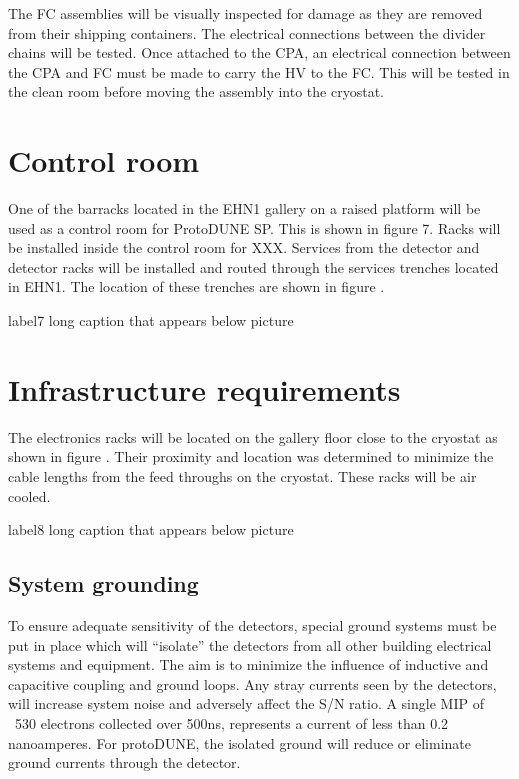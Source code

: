 The FC assemblies will be visually inspected for damage as they are removed from their shipping containers.  The electrical connections between the divider chains will be tested.  Once attached to the CPA, an electrical connection between the CPA and FC must be made to carry the HV to the FC.  This will be tested in the clean room before moving the assembly into the cryostat. 


\section{Control room}

One of the barracks located in the EHN1 gallery on a raised platform will be used as a control room for ProtoDUNE SP.  This is shown in figure 7.   Racks will be installed inside the control room for XXX.  Services from the detector and detector racks will be installed and routed through the services trenches located in EHN1.  The location of these trenches are shown in figure .  
%
\begin{cdrfigure}{label}{7 long caption that appears below picture}
\end{cdrfigure}
%

\section{Infrastructure requirements}

The electronics racks will be located on the gallery floor close to the cryostat as shown in figure .  Their proximity and location was determined to minimize the cable lengths from the feed throughs on the cryostat.  These racks will be air cooled.  
%
\begin{cdrfigure}{label}{8 long caption that appears below picture}
\end{cdrfigure}
%

\subsection{System grounding}

To ensure adequate sensitivity of the detectors, special ground systems must be put in place which will “isolate” the detectors from all other building electrical systems and equipment.  The aim is to minimize the influence of inductive and capacitive coupling and ground loops.  Any stray currents seen by the detectors, will increase system noise and adversely affect the S/N ratio.  A single MIP of ~530 electrons collected over 500ns, represents a current of less than 0.2 nanoamperes.  For protoDUNE, the isolated ground will reduce or eliminate ground currents through the detector.

